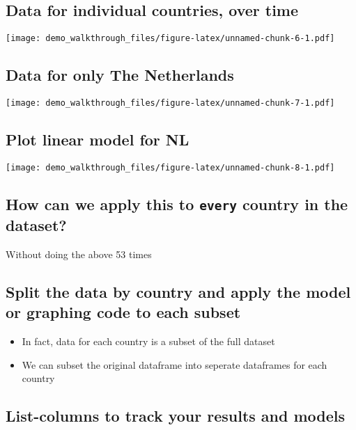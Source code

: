 \documentclass[]{article}
\providecommand{\tightlist}{%
  \setlength{\itemsep}{0pt}\setlength{\parskip}{0pt}}
\begin{document}
\subsection{Data for individual countries, over
time}\label{data-for-individual-countries-over-time}

\texttt{[image: demo\_walkthrough\_files/figure-latex/unnamed-chunk-6-1.pdf]}

\subsection{Data for only The
Netherlands}\label{data-for-only-the-netherlands}

\texttt{[image: demo\_walkthrough\_files/figure-latex/unnamed-chunk-7-1.pdf]}

\subsection{Plot linear model for NL}\label{plot-linear-model-for-nl}

\texttt{[image: demo\_walkthrough\_files/figure-latex/unnamed-chunk-8-1.pdf]}

\subsection{\texorpdfstring{How can we apply this to \texttt{every}
country in the
dataset?}{How can we apply this to every country in the dataset?}}\label{how-can-we-apply-this-to-every-country-in-the-dataset}

Without doing the above 53 times

\subsection{Split the data by country and apply the model or graphing
code to each
subset}\label{split-the-data-by-country-and-apply-the-model-or-graphing-code-to-each-subset}

\begin{itemize}
\tightlist
\item
  In fact, data for each country is a subset of the full dataset
\item
  We can subset the original dataframe into seperate dataframes for each
  country
\end{itemize}

\subsection{List-columns to track your results and
models}\label{list-columns-to-track-your-results-and-models}
\end{document}
